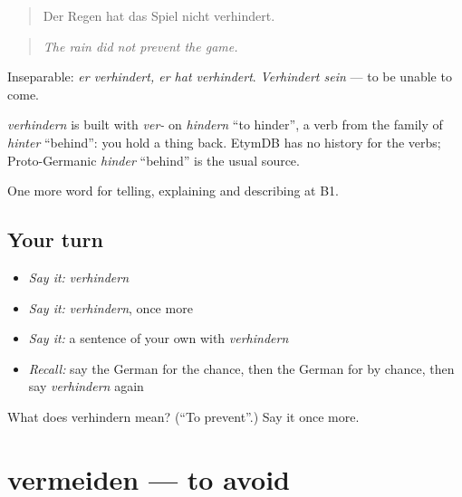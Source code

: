 \begin{quote}
Der Regen hat das Spiel nicht verhindert.
\end{quote}

\begin{quote}
\emph{The rain did not prevent the game.}
\end{quote}

Inseparable: \emph{er verhindert, er hat verhindert}. \emph{Verhindert sein} — to be unable to come.

\begin{cousinweb}
\emph{verhindern} is built with \emph{ver-} on \emph{hindern} \textquotedblleft{}to hinder\textquotedblright{}, a verb from the family of \emph{hinter} \textquotedblleft{}behind\textquotedblright{}: you hold a thing back. EtymDB has no history for the verbs; Proto-Germanic \emph{hinder} \textquotedblleft{}behind\textquotedblright{} is the usual source.
\end{cousinweb}

\begin{grammarlens}[title={What you've built}]
One more word for telling, explaining and describing at B1.
\end{grammarlens}

\subsection*{Your turn}
\begin{itemize}
\raggedright
  \item \emph{Say it:} \emph{verhindern}
  \item \emph{Say it:} \emph{verhindern}, once more
  \item \emph{Say it:} a sentence of your own with \emph{verhindern}
  \item \emph{Recall:} say the German for the chance, then the German for by chance, then say \emph{verhindern} again
\end{itemize}

\begin{tcolorbox}[breakable,colback=teal!4,colframe=teal!35!black,title={Before you move on}]
What does verhindern mean? (\textquotedblleft{}To prevent\textquotedblright{}.) Say it once more.
\end{tcolorbox}
\section[vermeiden]{vermeiden — to avoid}

\label{lesson:GE-C347-vermeiden}



